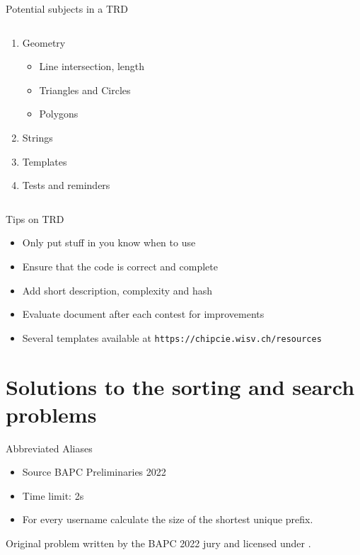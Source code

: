 \documentclass[11pt,pdf, aspectratio=169]{beamer}
\begin{document}
\begin{frame}{Potential subjects in a TRD}
\begin{columns}
\begin{column}{.45\textwidth}
\begin{enumerate}
\begin{itemize}
          \end{itemize}
          \item Geometry
          \begin{itemize}
            \item Line intersection, length
            \item Triangles and Circles
            \item Polygons
          \end{itemize}
          \item Strings
          \item Templates
          \item Tests and reminders
        \end{enumerate}
      \end{column}
    \end{columns}
  \end{frame}
  \begin{frame}{Tips on TRD}
    \begin{itemize}
      \item Only put stuff in you know when to use
      \item Ensure that the code is correct and complete
      \item Add short description, complexity and hash
      \item Evaluate document after each contest for improvements
      \item Several templates available at \texttt{https://chipcie.wisv.ch/resources}
    \end{itemize}
  \end{frame}


  \section{Solutions to the sorting and search problems}
  \begin{frame}{Abbreviated Aliases}
    \begin{itemize}
      \item Source BAPC Preliminaries 2022
      \item Time limit: 2s
      \item For every username calculate the size of the shortest unique prefix.
    \end{itemize}
    Original problem written by the BAPC 2022 jury and licensed under \doclicenseLongNameRef.

    \doclicenseImage
  \end{frame}
\end{document}
